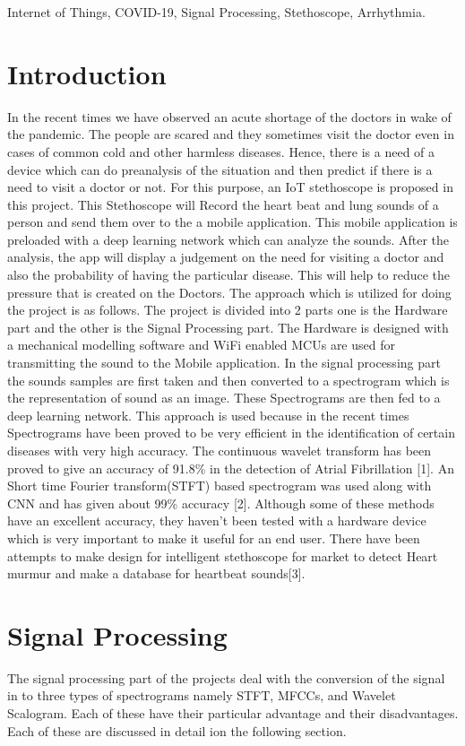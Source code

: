\documentclass[conference]{IEEEtran}
\begin{document}
\begin{IEEEkeywords}
Internet of Things, COVID-19, Signal Processing, Stethoscope, Arrhythmia.
\end{IEEEkeywords}

\section{Introduction}
In the recent times we have observed an acute shortage of the doctors in wake of the pandemic. The people are scared and they sometimes visit the doctor even in cases of common cold and other harmless diseases. Hence, there is a need of a device which can do preanalysis of the situation and then predict if there is a need to visit a doctor or not. For this purpose, an IoT stethoscope is proposed in this project. This Stethoscope will Record the heart beat and lung sounds of a person and send them over to the a mobile application. This mobile application is preloaded with a deep learning network which can analyze the sounds. After the analysis, the app will display a judgement on the need for visiting a doctor and also the probability of having the particular disease. This will help to reduce the pressure that is created on the Doctors. The approach which is utilized for doing the project is as follows. The project is divided into 2 parts one is the Hardware part and the other is the Signal Processing part. The Hardware is designed with a mechanical modelling software and WiFi enabled MCUs are used for transmitting the sound to the Mobile application. In the signal processing part the sounds samples are first taken and then converted to a spectrogram which is the representation of sound as an image. These Spectrograms are then fed to a deep learning network. This approach is used because in the recent times Spectrograms have been proved to be very efficient in the identification of certain diseases with very high accuracy. The  continuous wavelet transform has been proved to give an accuracy of 91.8\% in the detection of Atrial Fibrillation [1]. An Short time Fourier transform(STFT) based spectrogram was used along with CNN and has given about 99\% accuracy [2]. Although some of these methods have an excellent accuracy, they haven't been tested with a hardware device which is very important to make it useful for an end user. There have been attempts to make design for intelligent stethoscope for market to detect Heart murmur and make a database for heartbeat sounds[3].
 
\section{Signal Processing}
The signal processing part of the projects deal with the conversion of the signal in to three types of spectrograms namely STFT, MFCCs, and Wavelet Scalogram. Each of these have their particular advantage and their disadvantages. Each of these are discussed in detail ion the following section.
\end{document}
